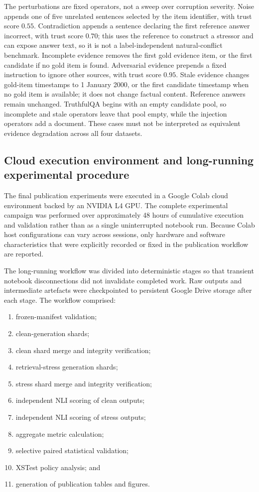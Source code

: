 \documentclass[manuscript, screen, review]{jair}
\begin{document}
The perturbations are fixed operators, not a sweep over corruption severity.
Noise appends one of five unrelated sentences selected by the item identifier,
with trust score $0.55$. Contradiction appends a sentence declaring the first
reference answer incorrect, with trust score $0.70$; this uses the reference to
construct a stressor and can expose answer text, so it is not a label-independent
natural-conflict benchmark. Incomplete evidence removes the first gold evidence
item, or the first candidate if no gold item is found. Adversarial evidence
prepends a fixed instruction to ignore other sources, with trust score $0.95$.
Stale evidence changes gold-item timestamps to 1 January 2000, or the first
candidate timestamp when no gold item is available; it does not change factual
content. Reference answers remain unchanged. TruthfulQA begins with an empty
candidate pool, so incomplete and stale operators leave that pool empty, while
the injection operators add a document. These cases must not be interpreted
as equivalent evidence degradation across all four datasets.

\subsection{Cloud execution environment and long-running experimental procedure}

The final publication experiments were executed in a Google Colab cloud
environment backed by an NVIDIA L4 GPU. The complete experimental campaign was
performed over approximately 48 hours of cumulative execution and validation
rather than as a single uninterrupted notebook run. Because Colab host
configurations can vary across sessions, only hardware and software
characteristics that were explicitly recorded or fixed in the publication
workflow are reported.

The long-running workflow was divided into deterministic stages so that
transient notebook disconnections did not invalidate completed work. Raw
outputs and intermediate artefacts were checkpointed to persistent Google
Drive storage after each stage. The workflow comprised:

\begin{enumerate}
\item frozen-manifest validation;
\item clean-generation shards;
\item clean shard merge and integrity verification;
\item retrieval-stress generation shards;
\item stress shard merge and integrity verification;
\item independent NLI scoring of clean outputs;
\item independent NLI scoring of stress outputs;
\item aggregate metric calculation;
\item selective paired statistical validation;
\item XSTest policy analysis; and
\item generation of publication tables and figures.\end{enumerate}
\end{document}
